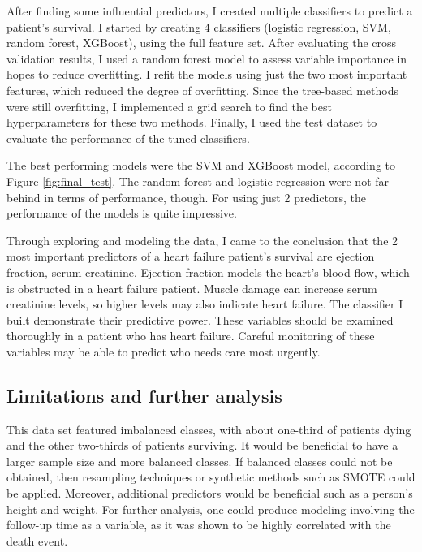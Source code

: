 \documentclass[12pt, letterpaper]{article}
\begin{document}
	After finding some influential predictors, I created multiple classifiers to predict a patient's survival. I started by creating 4 classifiers (logistic regression, SVM, random forest, XGBoost), using the full feature set. After evaluating the cross validation results, I used a random forest model to assess variable importance in hopes to reduce overfitting. I refit the models using just the two most important features, which reduced the degree of overfitting. Since the tree-based methods were still overfitting, I implemented a grid search to find the best hyperparameters for these two methods. Finally, I used the test dataset to evaluate the performance of the tuned classifiers.
	
	The best performing models were the SVM and XGBoost model, according to Figure \ref{fig:final_test}. The random forest and logistic regression were not far behind in terms of performance, though. For using just 2 predictors, the performance of the models is quite impressive.
	
	Through exploring and modeling the data, I came to the conclusion that the 2 most important predictors of a heart failure patient's survival are ejection fraction, serum creatinine. Ejection fraction models the heart's blood flow, which is obstructed in a heart failure patient. Muscle damage can increase serum creatinine levels, so higher levels may also indicate heart failure. The classifier I built demonstrate their predictive power. These variables should be examined thoroughly in a patient who has heart failure. Careful monitoring of these variables may be able to predict who needs care most urgently.
	
	\subsection{Limitations and further analysis}
	
	This data set featured imbalanced classes, with about one-third of patients dying and the other two-thirds of patients surviving. It would be beneficial to have a larger sample size and more balanced classes. If balanced classes could not be obtained, then resampling techniques or synthetic methods such as SMOTE could be applied. Moreover, additional predictors would be beneficial such as a person's height and weight. For further analysis, one could produce modeling involving the follow-up time as a variable, as it was shown to be highly correlated with the death event.
	
\nocite{*}
	

\end{document}
